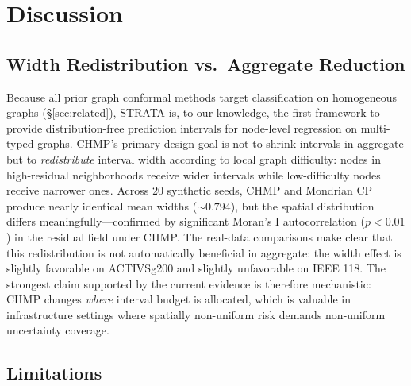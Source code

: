 \documentclass[twoside,11pt]{article}
\begin{document}
\section{Discussion}
\label{sec:discussion}

\subsection{Width Redistribution vs.\ Aggregate Reduction}

Because all prior graph conformal methods target classification on homogeneous
graphs (\S\ref{sec:related}), STRATA is, to our knowledge, the first
framework to provide distribution-free prediction intervals for node-level
regression on multi-typed graphs. CHMP's primary design goal is not to shrink
intervals in aggregate but to \emph{redistribute} interval width according to
local graph difficulty: nodes in high-residual neighborhoods receive wider
intervals while low-difficulty nodes receive narrower ones. Across 20 synthetic
seeds, CHMP and Mondrian CP produce nearly identical mean widths ($\sim 0.794$),
but the spatial distribution differs meaningfully---confirmed by significant
Moran's I autocorrelation ($p < 0.01$) in the residual field under CHMP. The
real-data comparisons make clear that this redistribution is not automatically
beneficial in aggregate: the width effect is slightly favorable on ACTIVSg200
and slightly unfavorable on IEEE 118. The strongest claim supported by the
current evidence is therefore mechanistic: CHMP changes \emph{where} interval
budget is allocated, which is valuable in infrastructure settings where
spatially non-uniform risk demands non-uniform uncertainty coverage.

\subsection{Limitations}
\end{document}
